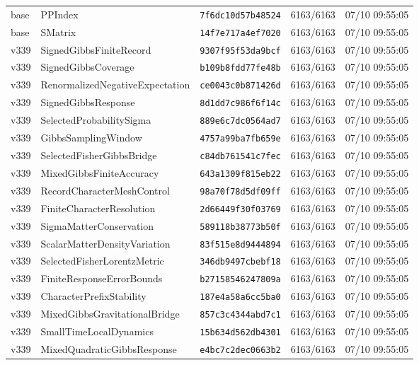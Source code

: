 \documentclass[11pt]{article}
\theoremstyle{definition}\newtheorem{deriv}{Derivação}
\begin{document}
{\begin{longtable}{@{}lllll@{}}
base & PPIndex & \texttt{7f6dc10d57b48524} & 6163/6163 & 07/10 09:55:05 \\
base & SMatrix & \texttt{14f7e717a4ef7020} & 6163/6163 & 07/10 09:55:05 \\
v339 & SignedGibbsFiniteRecord & \texttt{9307f95f53da9bcf} & 6163/6163 & 07/10 09:55:05 \\
v339 & SignedGibbsCoverage & \texttt{b109b8fdd77fe48b} & 6163/6163 & 07/10 09:55:05 \\
v339 & RenormalizedNegativeExpectation & \texttt{ce0043c0b871426d} & 6163/6163 & 07/10 09:55:05 \\
v339 & SignedGibbsResponse & \texttt{8d1dd7c986f6f14c} & 6163/6163 & 07/10 09:55:05 \\
v339 & SelectedProbabilitySigma & \texttt{889e6c7dc0564ad7} & 6163/6163 & 07/10 09:55:05 \\
v339 & GibbsSamplingWindow & \texttt{4757a99ba7fb659e} & 6163/6163 & 07/10 09:55:05 \\
v339 & SelectedFisherGibbsBridge & \texttt{c84db761541c7fec} & 6163/6163 & 07/10 09:55:05 \\
v339 & MixedGibbsFiniteAccuracy & \texttt{643a1309f815eb22} & 6163/6163 & 07/10 09:55:05 \\
v339 & RecordCharacterMeshControl & \texttt{98a70f78d5df09ff} & 6163/6163 & 07/10 09:55:05 \\
v339 & FiniteCharacterResolution & \texttt{2d66449f30f03769} & 6163/6163 & 07/10 09:55:05 \\
v339 & SigmaMatterConservation & \texttt{589118b38773b50f} & 6163/6163 & 07/10 09:55:05 \\
v339 & ScalarMatterDensityVariation & \texttt{83f515e8d9444894} & 6163/6163 & 07/10 09:55:05 \\
v339 & SelectedFisherLorentzMetric & \texttt{346db9497cbebf18} & 6163/6163 & 07/10 09:55:05 \\
v339 & FiniteResponseErrorBounds & \texttt{b27158546247809a} & 6163/6163 & 07/10 09:55:05 \\
v339 & CharacterPrefixStability & \texttt{187e4a58a6cc5ba0} & 6163/6163 & 07/10 09:55:05 \\
v339 & MixedGibbsGravitationalBridge & \texttt{857c3c4344abd7c1} & 6163/6163 & 07/10 09:55:05 \\
v339 & SmallTimeLocalDynamics & \texttt{15b634d562db4301} & 6163/6163 & 07/10 09:55:05 \\
v339 & MixedQuadraticGibbsResponse & \texttt{e4bc7c2dec0663b2} & 6163/6163 & 07/10 09:55:05 \\

\end{longtable}}
\end{document}
